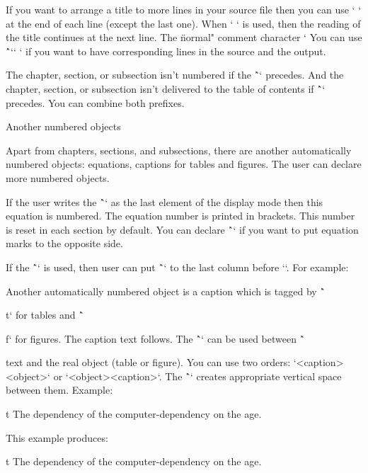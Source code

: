 If you want to arrange a title to more lines in your source file then you can
use `^^J` at the end of each line (except the last one).
When `^^J` is used, then the reading of the title continues at the next line.
The \"normal" comment character `%
You can use \^`\nl`{\visiblesp` ^^J`} if you want to have corresponding lines in the source
and the output.

The chapter, section, or subsection isn't numbered if the \^`\nonum` precedes.
And the chapter, section, or subsection isn't delivered to the table of
contents if \^`\notoc` precedes. You can combine both prefixes.

\secc[cap] Another numbered objects

Apart from chapters, sections, and subsections, there are another
automatically numbered objects: equations, captions for tables and
figures. The user can declare more numbered objects.

If the user writes the \^`\eqmark` as the last element of the display mode then
this equation is numbered. The equation number is printed in brackets. This number
is reset in each section by default. You can declare \^`\swapeqno` if you
want to put equation marks to the opposite side.

If the \^`\eqalignno` is used, then user can put \^`\eqmark` to the last column
before `\cr`. For example:

\begtt
{}
\endtt

Another automatically numbered object is a caption which is tagged by \^`\caption/t` for
tables and \^`\caption/f` for figures. The caption text follows.
The \^`\cskip` can be used between \^`\caption` text and the real object (table
or figure). You can use two orders: `<caption>\cskip <object>` or
`<object>\cskip <caption>`.
The \^`\cskip` creates appropriate vertical space between them. Example:

\begtt
\caption/t The dependency of the computer-dependency on the age.
\cskip
\noindent\hfil{}
\endtt

This example produces:

\medskip
\caption/t The dependency of the computer-dependency on the age.
\cskip
\noindent\hfil{}
\medskip

